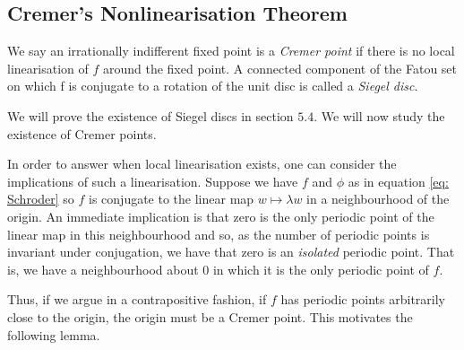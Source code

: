 \documentclass[../main.tex]{subfiles}
\begin{document}
\subsection{Cremer's Nonlinearisation Theorem}

\begin{dfn}
We say an irrationally indifferent fixed point is a \textit{Cremer point} if there is no local linearisation of $f$ around the fixed point. A connected component of the Fatou set on which f is conjugate to a rotation of the unit disc is called a \emph{Siegel disc}.
\end{dfn}

We will prove the existence of Siegel discs in section $5.4$. We will now study the existence of Cremer points.

In order to answer when local linearisation exists, one can consider the implications of such a linearisation. Suppose we have $f$ and $\phi$ as in equation \eqref{eq: Schroder} so $f$ is conjugate to the linear map $w \mapsto \lambda w$ in a neighbourhood of the origin. An immediate implication is that zero is the only periodic point of the linear map in this neighbourhood and so, as the number of periodic points is invariant under conjugation, we have that zero is an \emph{isolated} periodic point. That is, we have a neighbourhood about $0$ in which it is the only periodic point of $f$.

Thus, if we argue in a contrapositive fashion, if $f$ has periodic points arbitrarily close to the origin, the origin must be a Cremer point. This motivates the following lemma.
\end{document}

